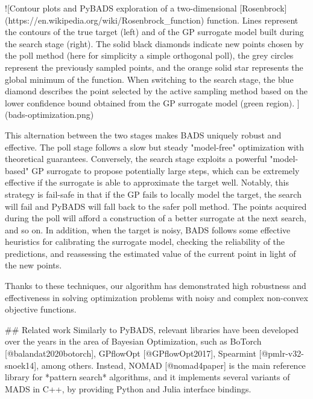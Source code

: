 \documentclass{article}
\begin{document}
\begin{markdown}
![Contour plots and PyBADS exploration of a two-dimensional [Rosenbrock](https://en.wikipedia.org/wiki/Rosenbrock_function) function. Lines represent the contours of the true target (left) and of the GP surrogate model built during the search stage (right). The solid black diamonds indicate new points chosen by the poll method (here for simplicity a simple orthogonal poll), the grey circles represent the previously sampled points, and the orange solid star represents the global minimum of the function. When switching to the search stage, the blue diamond describes the point selected by the active sampling method based on the lower confidence bound obtained from the GP surrogate model (green region). \label{fig:example}](bads-optimization.png)

This alternation between the two stages makes BADS uniquely robust and effective. The poll stage follows a slow but steady "model-free" optimization with theoretical guarantees. Conversely, the search stage exploits a powerful "model-based" GP surrogate to propose potentially large steps, which can be extremely effective if the surrogate is able to approximate the target well. Notably, this strategy is fail-safe in that if the GP fails to locally model the target, the search will fail and PyBADS will fall back to the safer poll method. The points acquired during the poll will afford a construction of a better surrogate at the next search, and so on.
In addition, when the target is noisy, BADS follows some effective heuristics for calibrating the surrogate model, checking the reliability of the predictions, and reassessing the estimated value of the current point in light of the new points. 

Thanks to these techniques, our algorithm has demonstrated high robustness and effectiveness in solving optimization problems with noisy and complex non-convex objective functions.

## Related work
Similarly to PyBADS, relevant libraries have been developed over the years in the area of Bayesian Optimization, such as BoTorch [@balandat2020botorch],  GPflowOpt [@GPflowOpt2017], Spearmint [@pmlr-v32-snoek14], among others. Instead, NOMAD [@nomad4paper] is the main reference library for *pattern search* algorithms, and it implements several variants of MADS in C++, by providing Python and Julia interface bindings.


\end{markdown}
\end{document}
